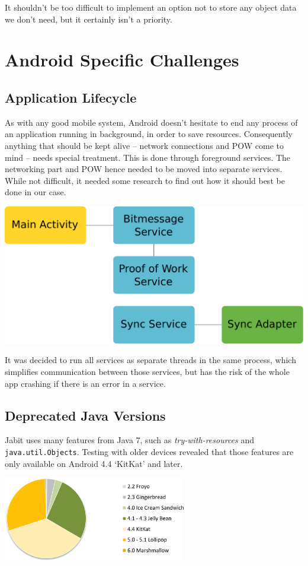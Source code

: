 \documentclass{bfh}
\begin{document}
  It shouldn't be too difficult to implement an option not to store any object data we don't need, but it certainly isn't a priority.


  \newpage
  \section{Android Specific Challenges}
  \subsection{Application Lifecycle}
  As with any good mobile system, Android doesn't hesitate to end any process of an application running in background, in order to save resources. Consequently anything that should be kept alive -- network connections and \ac{POW} come to mind -- needs special treatment. This is done through foreground services. The networking part and \ac{POW} hence needed to be moved into separate services. While not difficult, it needed some research to find out how it should best be done in our case.

  \begin{center}
    \includegraphics[width=0.8 \textwidth]{images/services.pdf}
  \end{center}

  It was decided to run all services as separate threads in the same process, which simplifies communication between those services, but has the risk of the whole app crashing if there is an error in a service.

  \subsection{Deprecated Java Versions}
  Jabit uses many features from Java 7, such as \textit{try-with-resources} and \texttt{java.util.Objects}. Testing with older devices revealed that those features are only available on Android 4.4 `KitKat' and later.

  \begin{center}
    \includegraphics[width=0.6\textwidth]{images/android_version_chart_dec_2015.png}
  \end{center}
\end{document}
